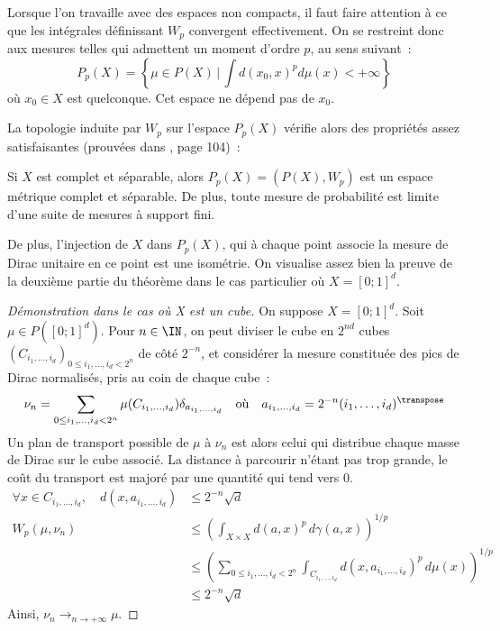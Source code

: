 Lorsque l'on travaille avec des espaces non compacts, il faut faire attention à ce que les intégrales définissant $W_p$ convergent effectivement. On se restreint donc aux mesures telles qui admettent un \og moment d'ordre $p$\fg, au sens suivant~:
\[P_p(X) = \left\{\mu \in P(X)\,|\, \int d(x_0,x)^p d\mu(x) < +\infty \right\} \]
où $x_0 \in X$ est quelconque. Cet espace ne dépend pas de $x_0$.

La topologie induite par $W_p$ sur l'espace $P_p(X)$ vérifie alors des propriétés assez satisfaisantes (prouvées dans \cite{villani08}, page 104)~: 
\begin{theoreme}
Si $X$ est complet et séparable, alors $P_p(X) = (P(X),W_p)$ est un espace métrique complet et séparable. De plus, toute mesure de probabilité est limite d'une suite de mesures à support fini.
\end{theoreme}
De plus, l'injection de $X$ dans $P_p(X)$, qui à chaque point associe la mesure de Dirac unitaire en ce point est une isométrie.
On visualise assez bien la preuve de la deuxième partie du théorème dans le cas particulier où $X = [0;1]^d$.
\begin{proof}[Démonstration dans le cas où X est un cube]
On suppose $X = [0;1]^d$.
Soit $\mu \in P([0;1]^d)$. Pour $n \in \IN$, on peut diviser le cube en $2^{nd}$ cubes $(C_{i_1,\ldots,i_d})_{0 \le i_1,\ldots,i_d < 2^n}$ de côté $2^{-n}$, et considérer la mesure constituée des pics de Dirac normalisés, pris au coin de chaque cube~:
\[\nu_n = \sum_{0 \le i_1,\ldots,i_d < 2^n} \mu(C_{i_1,\ldots,i_d}) \delta_{a_{i_1,\ldots,i_d}} 
\quad \text{où} \quad
a_{i_1,\ldots,i_d} = 2^{-n}(i_1,\ldots,i_d)^\transpose\]
Un plan de transport possible de $\mu$ à $\nu_n$ est alors celui qui distribue chaque masse de Dirac sur le cube associé. La distance à parcourir n'étant pas trop grande, le coût du transport est majoré par une quantité qui tend vers 0.
\[
\begin{split}
\forall x \in C_{i_1,\ldots,i_d},\quad d(x,a_{i_1,\ldots,i_d}) & \le 2^{-n} \sqrt{d} \\
W_p(\mu,\nu_n) &\le \left(\int_{X\times X} d(a,x)^p\,d\gamma(a,x)\right)^{1/p} \\
&\le \left(\sum_{0 \le i_1,\ldots,i_d < 2^n} \int_{C_{i_1,\ldots,i_d}} d(x,a_{i_1,\ldots,i_d})^p \, d\mu (x) \right)^{1/p} \\
& \le 2^{-n}\sqrt{d}
\end{split}
\]
Ainsi, $\nu_n \rightarrow_{n \rightarrow +\infty} \mu$.
\end{proof}

